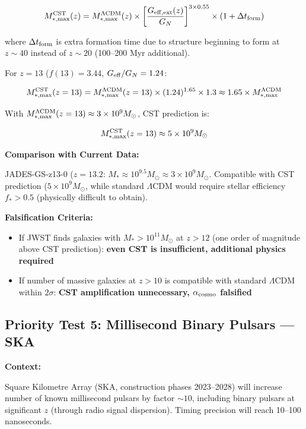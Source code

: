 \documentclass[11pt,a4paper]{article}
\providecommand{\tightlist}{\setlength{\itemsep}{0pt}\setlength{\parskip}{0pt}}
\begin{document}
\[M_{*,\rm max}^{\rm CST}(z) = M_{*,\rm max}^{\Lambda{\rm CDM}}(z) \times \left[\frac{G_{\rm eff,ext}(z)}{G_N}\right]^{3 \times 0.55} \times \left(1 + \Delta t_{\rm form}\right)\]

where \(\Delta t_{\rm form}\) is extra formation time due to structure
beginning to form at \(z \sim 40\) instead of \(z \sim 20\) (100--200
Myr additional).

For \(z = 13\) (\(f(13) = 3.44\), \(G_{\rm eff}/G_N = 1.24\):

\[M_{*,\rm max}^{\rm CST}(z=13) = M_{*,\rm max}^{\Lambda{\rm CDM}}(z=13) \times (1.24)^{1.65} \times 1.3 \approx 1.65 \times M_{*,\rm max}^{\Lambda{\rm CDM}}\]

With
\(M_{*,\rm max}^{\Lambda{\rm CDM}}(z=13) \approx 3\times10^9 M_\odot\),
CST prediction is:

\[M_{*,\rm max}^{\rm CST}(z=13) \approx 5\times10^9 M_\odot\]

\textbf{Comparison with Current Data:}

JADES-GS-z13-0 (\(z=13.2\):
\(M_* \approx 10^{9.5} M_\odot \approx 3\times10^9 M_\odot\). Compatible
with CST prediction (\(5\times10^9 M_\odot\), while standard
\(\Lambda\)CDM would require stellar efficiency \(f_* > 0.5\)
(physically difficult to obtain).

\textbf{Falsification Criteria:}

\begin{itemize}
\tightlist
\item
  If JWST finds galaxies with \(M_* > 10^{11} M_\odot\) at \(z > 12\)
  (one order of magnitude above CST prediction): \textbf{even CST is
  insufficient, additional physics required}
\item
  If number of massive galaxies at \(z > 10\) is compatible with
  standard \(\Lambda\)CDM within \(2\sigma\): \textbf{CST amplification
  unnecessary, \(\alpha_{\rm cosmo}\) falsified}
\end{itemize}

\hypertarget{priority-test-5-millisecond-binary-pulsars-ska}{%
\subsection{Priority Test 5: Millisecond Binary Pulsars ---
SKA}\label{priority-test-5-millisecond-binary-pulsars-ska}}

\textbf{Context:}

Square Kilometre Array (SKA, construction phases 2023--2028) will
increase number of known millisecond pulsars by factor \(\sim 10\),
including binary pulsars at significant \(z\) (through radio signal
dispersion). Timing precision will reach 10--100 nanoseconds.
\end{document}
